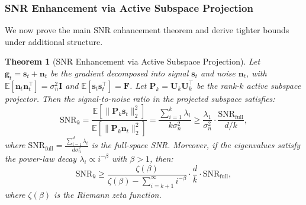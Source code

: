 \documentclass[preprint,12pt]{elsarticle}
\newtheorem{theorem}{Theorem}[section]
\begin{document}
\subsubsection{SNR Enhancement via Active Subspace Projection}
\label{sec:snr}

We now prove the main SNR enhancement theorem and derive tighter bounds under additional structure.

\begin{theorem}[SNR Enhancement via Active Subspace Projection]
\label{thm:snr}
Let $\mathbf{g}_t = \mathbf{s}_t + \mathbf{n}_t$ be the gradient decomposed into signal $\mathbf{s}_t$ and noise $\mathbf{n}_t$, with $\mathbb{E}[\mathbf{n}_t \mathbf{n}_t^\top] = \sigma_n^2 \mathbf{I}$ and $\mathbb{E}[\mathbf{s}_t \mathbf{s}_t^\top] = \mathbf{F}$. Let $\mathbf{P}_k = \mathbf{U}_k \mathbf{U}_k^\top$ be the rank-$k$ active subspace projector. Then the signal-to-noise ratio in the projected subspace satisfies:
\begin{equation}
\label{eq:snr_theorem}
\text{SNR}_k = \frac{\mathbb{E}\left[\|\mathbf{P}_k \mathbf{s}_t\|_2^2\right]}{\mathbb{E}\left[\|\mathbf{P}_k \mathbf{n}_t\|_2^2\right]} = \frac{\sum_{i=1}^{k} \lambda_i}{k \sigma_n^2} \geq \frac{\lambda_1}{\sigma_n^2} \cdot \frac{\text{SNR}_{\text{full}}}{d/k},
\end{equation}
where $\text{SNR}_{\text{full}} = \frac{\sum_{i=1}^{d} \lambda_i}{d \sigma_n^2}$ is the full-space SNR. Moreover, if the eigenvalues satisfy the power-law decay $\lambda_i \propto i^{-\beta}$ with $\beta > 1$, then:
\begin{equation}
\label{eq:snr_powerlaw}
\text{SNR}_k \geq \frac{\zeta(\beta)}{\zeta(\beta) - \sum_{i=k+1}^{\infty} i^{-\beta}} \cdot \frac{d}{k} \cdot \text{SNR}_{\text{full}},
\end{equation}
where $\zeta(\beta)$ is the Riemann zeta function.
\end{theorem}
\end{document}
